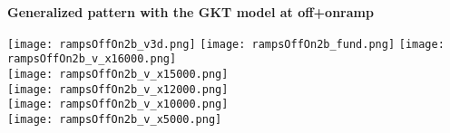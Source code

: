 \documentclass[a4paper,12pt]{scrartcl}
\begin{document}
\begin{center}

{\Large\sf\textbf{Generalized pattern with the GKT model at off+onramp}}


\hspace*{-40mm}
\texttt{[image: rampsOffOn2b\_v3d.png]}
\hspace*{-5mm}
\texttt{[image: rampsOffOn2b\_fund.png]}
\texttt{[image: rampsOffOn2b\_v\_x16000.png]} \\[-2mm]
\texttt{[image: rampsOffOn2b\_v\_x15000.png]} \\[-2mm]
\texttt{[image: rampsOffOn2b\_v\_x12000.png]} \\[-2mm]
\texttt{[image: rampsOffOn2b\_v\_x10000.png]} \\[-2mm]
\texttt{[image: rampsOffOn2b\_v\_x5000.png]}
\end{center}





\end{document}
